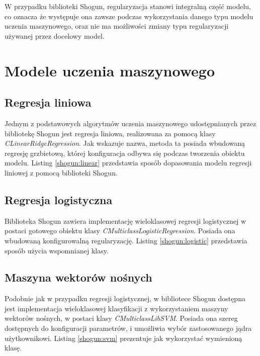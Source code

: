 W przypadku biblioteki Shogun, regularyzacja stanowi integralną część modelu, co oznacza że występuje ona zawsze podczas wykorzystania danego typu modelu uczenia maszynowego, oraz nie ma możliwości zmiany typu regularyzacji używanej przez docelowy model.

\section{Modele uczenia maszynowego}
\subsection{Regresja liniowa}
Jednym z podstawowych algorytmów uczenia maszynowego udostępnianych przez bibliotekę Shogun jest regresja liniowa, realizowana za pomocą klasy \textit{CLinearRidgeRegression}. Jak wskazuje nazwa, metoda ta posiada wbudowaną regresję grzbietową, której konfiguracja odbywa się podczas tworzenia obiektu modelu. Listing \ref{shogun:linear} przedstawia sposób dopasowania modelu regresji liniowej z pomocą biblioteki Shogun.


\subsection{Regresja logistyczna}
Biblioteka Shogun zawiera implementację wieloklasowej regresji logistycznej w postaci gotowego obiektu klasy \textit{CMulticlassLogisticRegression}. Posiada ona wbudowaną konfigurowalną regularyzację. Listing \ref{shogun:logistic} przedstawia sposób użycia wspomnianej klasy.


\subsection{Maszyna wektorów nośnych}
Podobnie jak w przypadku regresji logistycznej, w bibliotece Shogun dostępna jest implementacja wieloklasowej klasyfikacji z wykorzystaniem maszyny wektorów nośnych, w postaci klasy \textit{CMulticlassLibSVM}. Posiada ona szereg dostępnych do konfiguracji parametrów, i umożliwia wybór zastosowanego jądra użytkownikowi. Listing \ref{shogun:svm} prezentuje jak wykorzystać wymienioną klasę.


